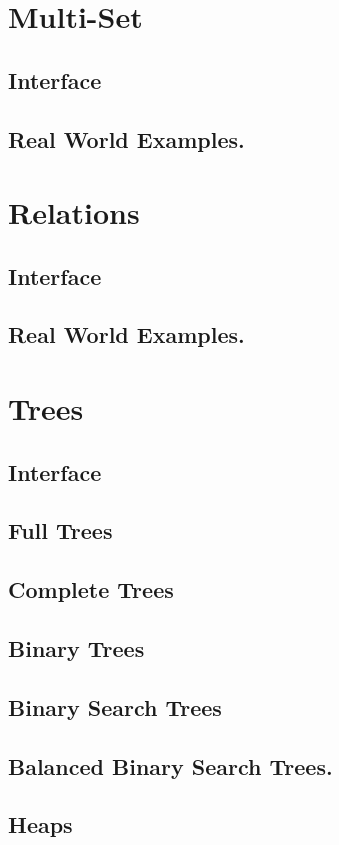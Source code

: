 \documentclass[12pt, letterpaper]{book}
\begin{document}
\section{Multi-Set}
	\subsection{Interface}
	\subsection{Real World Examples.}
\section{Relations}
	\subsection{Interface}
	\subsection{Real World Examples.}
\section{Trees}
	\subsection{Interface}
	\subsection{Full Trees}
	\subsection{Complete Trees}
	\subsection{Binary Trees}
	\subsection{Binary Search Trees}
	\subsection{Balanced Binary Search Trees.}
	\subsection{Heaps}
\end{document}
